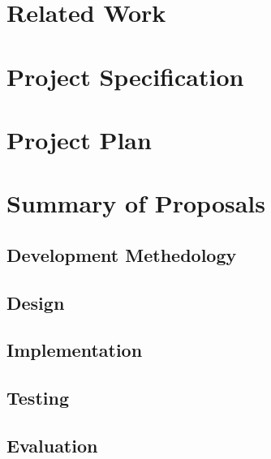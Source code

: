\documentclass{FinalYearReport}[2020/09/15]
\begin{document}
        \chapter{Related Work}
        \chapter{Project Specification}
        \chapter{Project Plan}

        \chapter{Summary of Proposals}
        \section{Development Methedology}
        \section{Design}
        \section{Implementation}
        \section{Testing}
        \section{Evaluation}
	
	
	
	\clearpage
	\printbibliography
	\nocite{*} %
\end{document}
